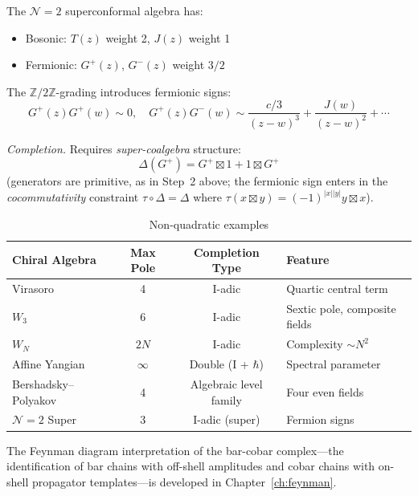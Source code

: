 \begin{example}
\label{ex:n2-superconformal}

The $\mathcal{N}=2$ superconformal algebra has:
\begin{itemize}
\item Bosonic: $T(z)$ weight 2, $J(z)$ weight 1
\item Fermionic: $G^+(z)$, $G^-(z)$ weight $3/2$
\end{itemize}

The $\mathbb{Z}/2\mathbb{Z}$-grading introduces fermionic signs:
\[G^+(z)G^+(w) \sim 0, \quad G^+(z)G^-(w) \sim \frac{c/3}{(z-w)^3} + \frac{J(w)}{(z-w)^2} + \cdots\]

\emph{Completion.} Requires \emph{super-coalgebra} structure:
\[\Delta(G^+) = G^+ \boxtimes 1 + 1 \boxtimes G^+\]
(generators are primitive, as in Step~2 above; the fermionic sign enters in the \emph{cocommutativity} constraint $\tau \circ \Delta = \Delta$ where $\tau(x \boxtimes y) = (-1)^{|x||y|} y \boxtimes x$).
\end{example}


\begin{table}[ht]
\centering
\caption{Non-quadratic examples}
\begin{tabular}{|l|c|c|l|}
\hline
\textbf{Chiral Algebra} & \textbf{Max Pole} & \textbf{Completion Type} & \textbf{Feature} \\
\hline
Virasoro & 4 & I-adic & Quartic central term \\
$W_3$ & 6 & I-adic & Sextic pole, composite fields \\
$W_N$ & $2N$ & I-adic & Complexity $\sim N^2$ \\
Affine Yangian & $\infty$ & Double (I + $\hbar$) & Spectral parameter \\
Bershadsky--Polyakov & 4 & Algebraic level family & Four even fields \\
$\mathcal{N}=2$ Super & 3 & I-adic (super) & Fermion signs \\
\hline
\end{tabular}
\end{table}

\begin{remark}\label{sec:feynman_genus_g}
The Feynman diagram interpretation of the bar-cobar complex---the identification
of bar chains with off-shell amplitudes and cobar chains with on-shell propagator
templates---is developed in Chapter~\ref{ch:feynman}.
\end{remark}


